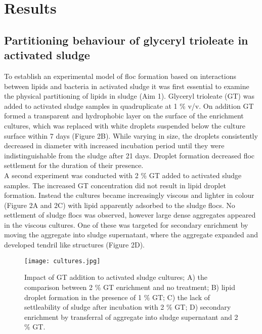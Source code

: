 \documentclass[twoside]{article}
\begin{document}
\section{Results}
\thispagestyle{plain}
\subsection{Partitioning behaviour of glyceryl trioleate in activated sludge}

To establish an experimental model of floc formation based on interactions between lipids and bacteria in activated sludge it was first essential to examine the physical partitioning of lipids in sludge (Aim 1). Glyceryl trioleate (GT) was added to activated sludge samples in quadruplicate at 1 \% v/v. On addition GT formed a transparent and hydrophobic layer on the surface of the enrichment cultures, which was replaced with white droplets suspended below the culture surface within 7 days (Figure 2B). While varying in size, the droplets consistently decreased in diameter with increased incubation period until they were indistinguishable from the sludge after 21 days. Droplet formation decreased floc settlement for the duration of their presence.\\

A second experiment was conducted with 2 \% GT added to activated sludge samples. The increased GT concentration did not result in lipid droplet formation. Instead the cultures became increasingly viscous and lighter in colour (Figure 2A and 2C) with lipid apparently adsorbed to the sludge flocs. No settlement of sludge flocs was observed, however large dense aggregates appeared in the viscous cultures. One of these was targeted for secondary enrichment by moving the aggregate into sludge supernatant, where the aggregate expanded and developed tendril like structures (Figure 2D).

\begin{figure}
\texttt{[image: cultures.jpg]}
\caption{Impact of GT addition to activated sludge cultures; A) the comparison between 2 \% GT enrichment and no treatment; B) lipid droplet formation in the presence of 1 \% GT; C) the lack of settleability of sludge after incubation with 2 \% GT; D) secondary enrichment by transferral of aggregate into sludge supernatant and 2 \% GT.}
\end{figure}
\FloatBarrier
\end{document}
